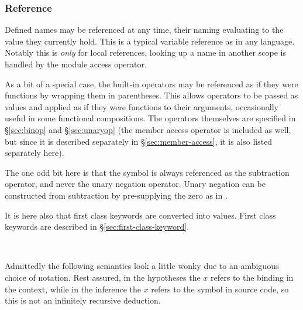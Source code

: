\subsubsection{Reference}

Defined names may be referenced at any time, their naming evaluating to the value
they currently hold. This is a typical variable reference as in any language.
Notably this is \emph{only} for local references, looking up a name in another
scope is handled by the module access operator.

As a bit of a special case, the built-in operators may be referenced as if they
were functions by wrapping them in parentheses. This allows operators to be passed
as values and applied as if they were functions to their arguments, occasionally
useful in some functional compositions. The operators themselves are specified
in \S\ref{sec:binop} and \S\ref{sec:unaryop} (the member access operator is included
as well, but since it is described separately in \S\ref{sec:member-access}, it is
also listed separately here).

The one odd bit here is that the \op{-} symbol is always referenced as the
subtraction operator, and never the unary negation operator. Unary negation
can be constructed from subtraction by pre-supplying the zero as in .

It is here also that first class keywords are converted into values.
First class keywords are described in \S\ref{sec:first-class-keyword}.

\begin{bnf*}
     \\
\end{bnf*}

Admittedly the following semantics look a little wonky due to an ambiguous choice
of notation. Rest assured, in the hypotheses the $x$ refers to the binding in the
context, while in the inference the $x$ refers to the symbol in source code, so
this is not an infinitely recursive deduction.

